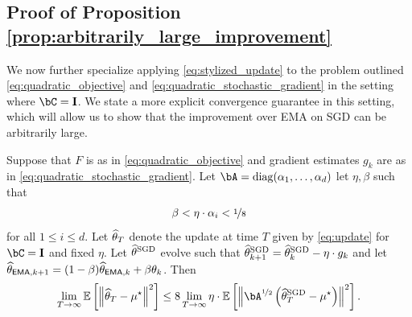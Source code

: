 \subsection{Proof of Proposition \ref{prop:arbitrarily_large_improvement}}\label{app:arbitrarily_large_improvement}

We now further specialize applying \eqref{eq:stylized_update} to the problem outlined \eqref{eq:quadratic_objective} and \eqref{eq:quadratic_stochastic_gradient} in the setting where $\bC = \eye$.  We state a more explicit convergence guarantee in this setting, which will allow us to show that the improvement over EMA on SGD can be arbitrarily large.
\begin{proposition}
    Suppose that $F$ is as in \eqref{eq:quadratic_objective} and gradient estimates $g_k$ are as in \eqref{eq:quadratic_stochastic_gradient}.  Let $\bA = \diag(\alpha_1, \dots, \alpha_d)$ let $\eta, \beta$ such that
    \begin{align}
        \beta < \eta \cdot \alpha_i < \nicefrac 18
    \end{align}
    for all $1 \leq i \leq d$.  Let $\thetahat_T$ denote the update at time $T$ given by \eqref{eq:update} for $\bC = \eye$ and fixed $\eta$.  Let $\thetasgd$ evolve such that $\thetasgd_{k+1} = \thetasgd_k - \eta \cdot g_k$ and let $\thetema[k+1] = (1 - \beta) \thetema[k] + \beta \theta_k$.  Then
    \begin{align}
        \lim_{T \to \infty}\ee\left[ \norm{\thetahat_T - \mustar}^2 \right] \leq 8 \lim_{T \to \infty} \eta \cdot \ee\left[ \norm{\bA^{\nicefrac 12}\left( \thetasgd_T - \mustar \right)}^2 \right].
    \end{align}
\end{proposition}
